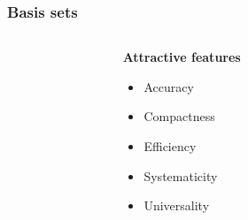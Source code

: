 \begin{frame}
    \frametitle{Basis sets}
    \begin{columns}
    \begin{column}{.10\textwidth}
    \end{column}
    \begin{column}{.30\textwidth}
    \textbf{Attractive features}
    \begin{itemize}
        \item Accuracy
        \item Compactness
        \item Efficiency
        \item Systematicity
        \item Universality
    \end{itemize}
    \end{column}
    \begin{column}{.60\textwidth}

    \vspace{5mm}

    \end{column}
    \end{columns}    

    \vspace{40.2mm}

\end{frame}

